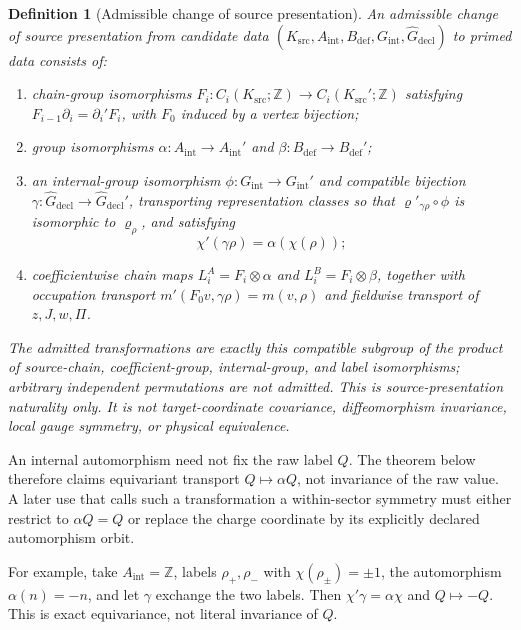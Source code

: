 \documentclass[11pt]{article}
\newtheorem{definition}{Definition}
\newcommand{\Ksrc}{K_{\mathrm{src}}}
\newcommand{\Aint}{A_{\mathrm{int}}}
\newcommand{\Bdef}{B_{\mathrm{def}}}
\newcommand{\Gint}{G_{\mathrm{int}}}
\newcommand{\Rdecl}{\widehat G_{\mathrm{decl}}}
\begin{document}
\begin{definition}[Admissible change of source presentation]
An admissible change of source presentation from candidate data
\((\Ksrc,\Aint,\Bdef,\Gint,\Rdecl)\) to primed data consists of:
\begin{enumerate}[leftmargin=*]
\item chain-group isomorphisms
  \(F_i:C_i(\Ksrc;\mathbb Z)\to C_i(\Ksrc';\mathbb Z)\) satisfying
  \(F_{i-1}\partial_i=\partial_i'F_i\), with \(F_0\) induced by a vertex
  bijection;
\item group isomorphisms
  \(\alpha:\Aint\to\Aint'\) and
  \(\beta:\Bdef\to\Bdef'\);
\item an internal-group isomorphism
  \(\phi:\Gint\to\Gint'\) and compatible bijection
  \(\gamma:\Rdecl\to\Rdecl'\), transporting representation classes so that
  \(\varrho'_{\gamma\rho}\circ\phi\) is isomorphic to
  \(\varrho_\rho\), and satisfying
  \[
    \chi'(\gamma\rho)=\alpha(\chi(\rho));
  \]
\item coefficientwise chain maps
  \(L_i^A=F_i\otimes\alpha\) and
  \(L_i^B=F_i\otimes\beta\), together with occupation transport
  \(m'(F_0v,\gamma\rho)=m(v,\rho)\) and fieldwise transport of
  \(z,J,w,\Pi\).
\end{enumerate}
The admitted transformations are exactly this compatible subgroup of the
product of source-chain, coefficient-group, internal-group, and label
isomorphisms; arbitrary independent permutations are not admitted.
This is source-presentation naturality only. It is not target-coordinate
covariance, diffeomorphism invariance, local gauge symmetry, or physical
equivalence.
\end{definition}

An internal automorphism need not fix the raw label \(Q\). The theorem below
therefore claims equivariant transport \(Q\mapsto\alpha Q\), not invariance of
the raw value. A later use that calls such a transformation a
within-sector symmetry must either restrict to \(\alpha Q=Q\) or replace the
charge coordinate by its explicitly declared automorphism orbit.

For example, take \(\Aint=\mathbb Z\), labels
\(\rho_+,\rho_-\) with \(\chi(\rho_\pm)=\pm1\), the automorphism
\(\alpha(n)=-n\), and let \(\gamma\) exchange the two labels. Then
\(\chi'\gamma=\alpha\chi\) and \(Q\mapsto-Q\). This is exact equivariance,
not literal invariance of \(Q\).
\end{document}
